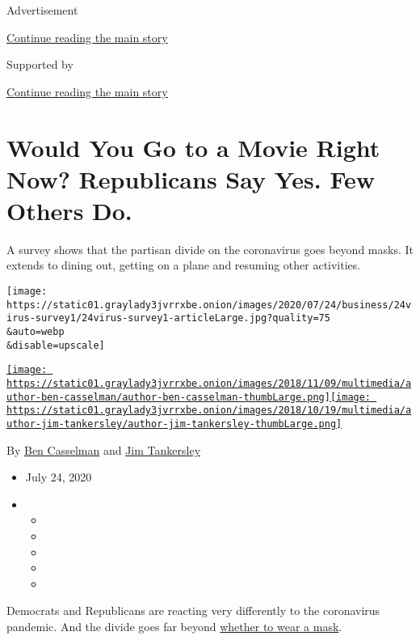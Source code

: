 Advertisement

\protect\hyperlink{after-top}{Continue reading the main story}

Supported by

\protect\hyperlink{after-sponsor}{Continue reading the main story}

\hypertarget{would-you-go-to-a-movie-right-now-republicans-say-yes-few-others-do}{%
\section{Would You Go to a Movie Right Now? Republicans Say Yes. Few
Others
Do.}\label{would-you-go-to-a-movie-right-now-republicans-say-yes-few-others-do}}

A survey shows that the partisan divide on the coronavirus goes beyond
masks. It extends to dining out, getting on a plane and resuming other
activities.

\texttt{[image: https://static01.graylady3jvrrxbe.onion/images/2020/07/24/business/24virus-survey1/24virus-survey1-articleLarge.jpg?quality=75\\\&auto=webp\\\&disable=upscale]}

\href{https://www.nytimes3xbfgragh.onion/by/ben-casselman}{\texttt{[image: https://static01.graylady3jvrrxbe.onion/images/2018/11/09/multimedia/author-ben-casselman/author-ben-casselman-thumbLarge.png]}}\href{https://www.nytimes3xbfgragh.onion/by/jim-tankersley}{\texttt{[image: https://static01.graylady3jvrrxbe.onion/images/2018/10/19/multimedia/author-jim-tankersley/author-jim-tankersley-thumbLarge.png]}}

By \href{https://www.nytimes3xbfgragh.onion/by/ben-casselman}{Ben
Casselman} and
\href{https://www.nytimes3xbfgragh.onion/by/jim-tankersley}{Jim
Tankersley}

\begin{itemize}
\item
  July 24, 2020
\item
  \begin{itemize}
  \item
  \item
  \item
  \item
  \item
  \end{itemize}
\end{itemize}

Democrats and Republicans are reacting very differently to the
coronavirus pandemic. And the divide goes far beyond
\href{https://www.nytimes3xbfgragh.onion/interactive/2020/07/17/upshot/coronavirus-face-mask-map.html}{whether
to wear a mask}.

